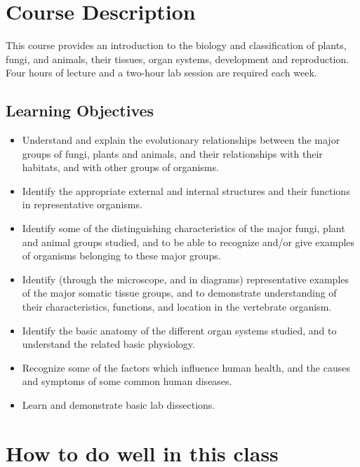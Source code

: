 \documentclass[]{book}
\begin{document}
\hypertarget{course-description}{%
\chapter{Course Description}\label{course-description}}

This course provides an introduction to the biology and classification of plants, fungi, and animals, their tissues, organ systems, development and reproduction. Four hours of lecture and a two-hour lab session are required each week.

\hypertarget{learning-objectives}{%
\section{Learning Objectives}\label{learning-objectives}}

\begin{itemize}
\item
  Understand and explain the evolutionary relationships between the major groups of fungi, plants and animals, and their relationships with their habitats, and with other groups of organisms.
\item
  Identify the appropriate external and internal structures and their functions in representative organisms.
\item
  Identify some of the distinguishing characteristics of the major fungi, plant and animal groups studied, and to be able to recognize and/or give examples of organisms belonging to these major groups.
\item
  Identify (through the microscope, and in diagrams) representative examples of the major somatic tissue groups, and to demonstrate understanding of their characteristics, functions, and location in the vertebrate organism.
\item
  Identify the basic anatomy of the different organ systems studied, and to understand the related basic physiology.
\item
  Recognize some of the factors which influence human health, and the causes and symptoms of some common human diseases.
\item
  Learn and demonstrate basic lab dissections.
\end{itemize}

\hypertarget{how-to-do-well-in-this-class}{%
\chapter{How to do well in this class}\label{how-to-do-well-in-this-class}}
\end{document}
